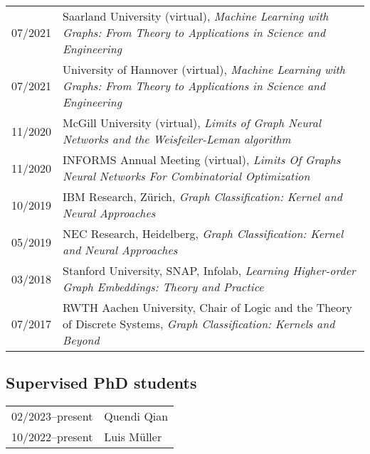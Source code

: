 \documentclass[11pt, a4paper, DIV=12]{scrartcl}
\begin{document}
\begin{tabular}{p{2.1cm}p{12.0cm}}
07/2021&Saarland University (virtual), \emph{Machine Learning with Graphs: From Theory to Applications in Science and Engineering}\\
07/2021&University of Hannover (virtual), \emph{Machine Learning with Graphs:
	From Theory to Applications in Science and Engineering}\\
11/2020&McGill University (virtual), \emph{Limits of Graph Neural Networks and the Weisfeiler-Leman algorithm}\\
11/2020&INFORMS Annual Meeting (virtual), \emph{Limits Of Graphs Neural Networks For Combinatorial Optimization}\\
10/2019&IBM Research, Zürich, \emph{Graph Classification: Kernel and Neural Approaches}\\
05/2019&NEC Research, Heidelberg, \emph{Graph Classification: Kernel and Neural Approaches}\\ 
03/2018&Stanford University, SNAP, Infolab, \emph{Learning Higher-order Graph Embeddings: Theory and Practice}\\
07/2017&RWTH Aachen University, Chair of Logic and the Theory of Discrete Systems, \emph{Graph Classification: Kernels and Beyond}\\
\end{tabular}

\subsection*{Supervised PhD students}
\begin{tabular}{p{3.0cm}p{11.5cm}}
	02/2023--present& Quendi Qian\\
	10/2022--present& Luis Müller\\
\end{tabular}
\end{document}
